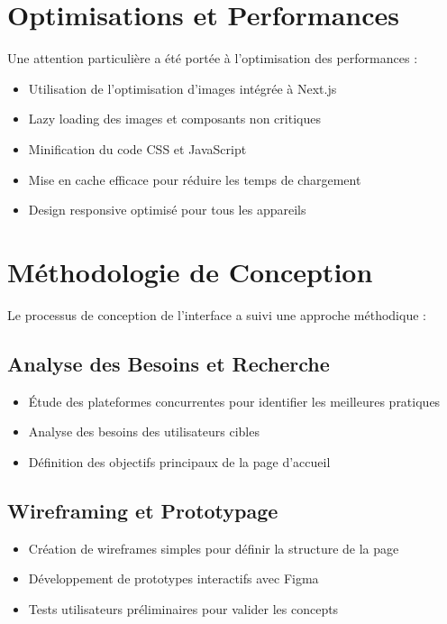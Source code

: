 \section{Optimisations et Performances}

Une attention particulière a été portée à l'optimisation des performances :
\begin{itemize}
  \item Utilisation de l'optimisation d'images intégrée à Next.js
  \item Lazy loading des images et composants non critiques
  \item Minification du code CSS et JavaScript
  \item Mise en cache efficace pour réduire les temps de chargement
  \item Design responsive optimisé pour tous les appareils
\end{itemize}

\section{Méthodologie de Conception}

Le processus de conception de l'interface a suivi une approche méthodique :

\subsection{Analyse des Besoins et Recherche}
\begin{itemize}
  \item Étude des plateformes concurrentes pour identifier les meilleures pratiques
  \item Analyse des besoins des utilisateurs cibles
  \item Définition des objectifs principaux de la page d'accueil
\end{itemize}

\subsection{Wireframing et Prototypage}
\begin{itemize}
  \item Création de wireframes simples pour définir la structure de la page
  \item Développement de prototypes interactifs avec Figma
  \item Tests utilisateurs préliminaires pour valider les concepts
\end{itemize}

